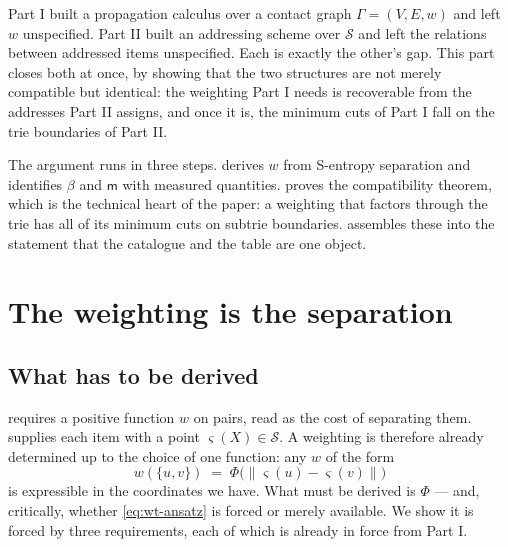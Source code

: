 \documentclass[11pt,twocolumn,a4paper]{article}
\theoremstyle{thmstyle}
\theoremstyle{definition}
\theoremstyle{remark}
\newcommand{\Gph}{\Gamma}
\newcommand{\V}{V}
\newcommand{\E}{E}
\newcommand{\wt}{w}
\newcommand{\med}{\mathsf{m}}
\newcommand{\flo}{\beta}
\newcommand{\Sspace}{\mathcal{S}}
\newcommand{\sse}{\varsigma}
\newcommand{\norm}[1]{\lVert#1\rVert}
\begin{document}
\noindent
Part I built a propagation calculus over a contact graph
$\Gph = (\V,\E,\wt)$ and left $\wt$ unspecified. Part II built an
addressing scheme over $\Sspace$ and left the relations between
addressed items unspecified. Each is exactly the other's gap. This
part closes both at once, by showing that the two structures are not
merely compatible but identical: the weighting Part I needs is
recoverable from the addresses Part II assigns, and once it is, the
minimum cuts of Part I fall on the trie boundaries of Part II.

The argument runs in three steps.  derives $\wt$
from S-entropy separation and identifies $\flo$ and $\med$ with
measured quantities.  proves the
compatibility theorem, which is the technical heart of the paper: a
weighting that factors through the trie has all of its minimum cuts on
subtrie boundaries.  assembles these into the
statement that the catalogue and the table are one object.

\section{The weighting is the separation}
\label{sec:weighting}

\subsection{What has to be derived}

 requires a positive function $\wt$ on pairs, read as
the cost of separating them.  supplies each item
with a point $\sse(X) \in \Sspace$. A weighting is therefore already
determined up to the choice of one function: any $\wt$ of the form
\begin{equation}
  \wt(\{u,v\}) \;=\; \Phi\bigl(\norm{\sse(u) - \sse(v)}\bigr)
  \label{eq:wt-ansatz}
\end{equation}
is expressible in the coordinates we have. What must be derived is
$\Phi$ --- and, critically, whether \eqref{eq:wt-ansatz} is forced or
merely available. We show it is forced by three requirements, each of
which is already in force from Part I.
\end{document}
